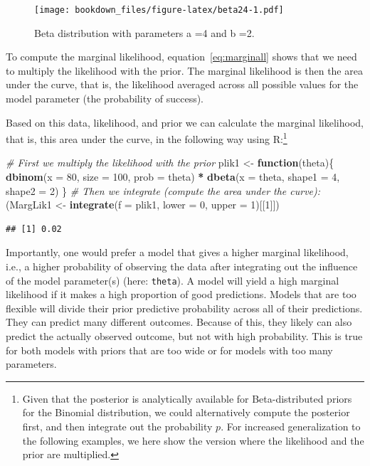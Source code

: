 \documentclass[12pt,]{krantz}
\newenvironment{Shaded}{\begin{snugshade}}{\end{snugshade}}
\newcommand{\KeywordTok}[1]{\textcolor[rgb]{0.13,0.29,0.53}{\textbf{#1}}}
\newcommand{\DataTypeTok}[1]{\textcolor[rgb]{0.13,0.29,0.53}{#1}}
\newcommand{\DecValTok}[1]{\textcolor[rgb]{0.00,0.00,0.81}{#1}}
\newcommand{\StringTok}[1]{\textcolor[rgb]{0.31,0.60,0.02}{#1}}
\newcommand{\CommentTok}[1]{\textcolor[rgb]{0.56,0.35,0.01}{\textit{#1}}}
\newcommand{\ControlFlowTok}[1]{\textcolor[rgb]{0.13,0.29,0.53}{\textbf{#1}}}
\newcommand{\OperatorTok}[1]{\textcolor[rgb]{0.81,0.36,0.00}{\textbf{#1}}}
\newcommand{\NormalTok}[1]{#1}
\theoremstyle{definition}
\theoremstyle{definition}
\theoremstyle{definition}
\theoremstyle{remark}
\begin{document}
\begin{figure}
\centering
\texttt{[image: bookdown\_files/figure-latex/beta24-1.pdf]}
\caption{\label{fig:beta24}Beta distribution with parameters a =4 and b =2.}
\end{figure}

To compute the marginal likelihood, equation~\eqref{eq:marginall} shows
that we need to multiply the likelihood with the prior. The marginal
likelihood is then the area under the curve, that is, the likelihood
averaged across all possible values for the model parameter (the
probability of success).

Based on this data, likelihood, and prior we can calculate the marginal
likelihood, that is, this area under the curve, in the following way
using R:\footnote{Given that the posterior is analytically available for
  Beta-distributed priors for the Binomial distribution, we could
  alternatively compute the posterior first, and then integrate out the
  probability \(p\). For increased generalization to the following
  examples, we here show the version where the likelihood and the prior
  are multiplied.}

\begin{Shaded}
\begin{Highlighting}[]
\CommentTok{# First we multiply the likelihood with the prior}
\NormalTok{plik1 <-}\StringTok{ }\ControlFlowTok{function}\NormalTok{(theta)\{}
  \KeywordTok{dbinom}\NormalTok{(}\DataTypeTok{x =} \DecValTok{80}\NormalTok{, }\DataTypeTok{size =} \DecValTok{100}\NormalTok{, }\DataTypeTok{prob =}\NormalTok{ theta) }\OperatorTok{*}
\StringTok{    }\KeywordTok{dbeta}\NormalTok{(}\DataTypeTok{x =}\NormalTok{ theta, }\DataTypeTok{shape1 =} \DecValTok{4}\NormalTok{, }\DataTypeTok{shape2 =} \DecValTok{2}\NormalTok{)}
\NormalTok{  \}}
\CommentTok{# Then we integrate (compute the area under the curve):}
\NormalTok{(MargLik1 <-}\StringTok{ }\KeywordTok{integrate}\NormalTok{(}\DataTypeTok{f =}\NormalTok{ plik1, }\DataTypeTok{lower =} \DecValTok{0}\NormalTok{, }\DataTypeTok{upper =} \DecValTok{1}\NormalTok{)[[}\DecValTok{1}\NormalTok{]])}
\end{Highlighting}
\end{Shaded}

\begin{verbatim}
## [1] 0.02
\end{verbatim}

Importantly, one would prefer a model that gives a higher marginal
likelihood, i.e., a higher probability of observing the data after
integrating out the influence of the model parameter(s) (here:
\texttt{theta}). A model will yield a high marginal likelihood if it
makes a high proportion of good predictions. Models that are too
flexible will divide their prior predictive probability across all of
their predictions. They can predict many different outcomes. Because of
this, they likely can also predict the actually observed outcome, but
not with high probability. This is true for both models with priors that
are too wide or for models with too many parameters.
\end{document}
